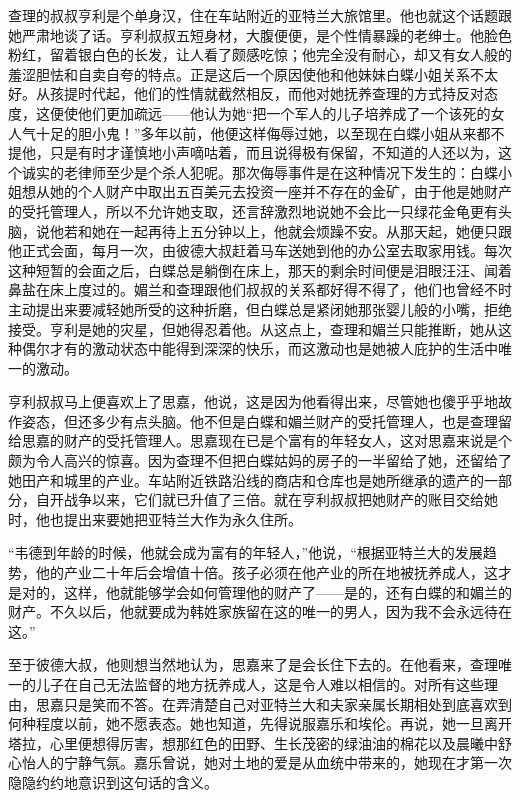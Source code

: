 \par 查理的叔叔亨利是个单身汉，住在车站附近的亚特兰大旅馆里。他也就这个话题跟她严肃地谈了话。亨利叔叔五短身材，大腹便便，是个性情暴躁的老绅士。他脸色粉红，留着银白色的长发，让人看了颇感吃惊；他完全没有耐心，却又有女人般的羞涩胆怯和自卖自夸的特点。正是这后一个原因使他和他妹妹白蝶小姐关系不太好。从孩提时代起，他们的性情就截然相反，而他对她抚养查理的方式持反对态度，这便使他们更加疏远——他认为她“把一个军人的儿子培养成了一个该死的女人气十足的胆小鬼！”多年以前，他便这样侮辱过她，以至现在白蝶小姐从来都不提他，只是有时才谨慎地小声嘀咕着，而且说得极有保留，不知道的人还以为，这个诚实的老律师至少是个杀人犯呢。那次侮辱事件是在这种情况下发生的：白蝶小姐想从她的个人财产中取出五百美元去投资一座并不存在的金矿，由于他是她财产的受托管理人，所以不允许她支取，还言辞激烈地说她不会比一只绿花金龟更有头脑，说他若和她在一起再待上五分钟以上，他就会烦躁不安。从那天起，她便只跟他正式会面，每月一次，由彼德大叔赶着马车送她到他的办公室去取家用钱。每次这种短暂的会面之后，白蝶总是躺倒在床上，那天的剩余时间便是泪眼汪汪、闻着鼻盐在床上度过的。媚兰和查理跟他们叔叔的关系都好得不得了，他们也曾经不时主动提出来要减轻她所受的这种折磨，但白蝶总是紧闭她那张婴儿般的小嘴，拒绝接受。亨利是她的灾星，但她得忍着他。从这点上，查理和媚兰只能推断，她从这种偶尔才有的激动状态中能得到深深的快乐，而这激动也是她被人庇护的生活中唯一的激动。
\par 亨利叔叔马上便喜欢上了思嘉，他说，这是因为他看得出来，尽管她也傻乎乎地故作姿态，但还多少有点头脑。他不但是白蝶和媚兰财产的受托管理人，也是查理留给思嘉的财产的受托管理人。思嘉现在已是个富有的年轻女人，这对思嘉来说是个颇为令人高兴的惊喜。因为查理不但把白蝶姑妈的房子的一半留给了她，还留给了她田产和城里的产业。车站附近铁路沿线的商店和仓库也是她所继承的遗产的一部分，自开战争以来，它们就已升值了三倍。就在亨利叔叔把她财产的账目交给她时，他也提出来要她把亚特兰大作为永久住所。
\par “韦德到年龄的时候，他就会成为富有的年轻人，”他说，“根据亚特兰大的发展趋势，他的产业二十年后会增值十倍。孩子必须在他产业的所在地被抚养成人，这才是对的，这样，他就能够学会如何管理他的财产了——是的，还有白蝶的和媚兰的财产。不久以后，他就要成为韩姓家族留在这的唯一的男人，因为我不会永远待在这。”
\par 至于彼德大叔，他则想当然地认为，思嘉来了是会长住下去的。在他看来，查理唯一的儿子在自己无法监督的地方抚养成人，这是令人难以相信的。对所有这些理由，思嘉只是笑而不答。在弄清楚自己对亚特兰大和夫家亲属长期相处到底喜欢到何种程度以前，她不愿表态。她也知道，先得说服嘉乐和埃伦。再说，她一旦离开塔拉，心里便想得厉害，想那红色的田野、生长茂密的绿油油的棉花以及晨曦中舒心怡人的宁静气氛。嘉乐曾说，她对土地的爱是从血统中带来的，她现在才第一次隐隐约约地意识到这句话的含义。

